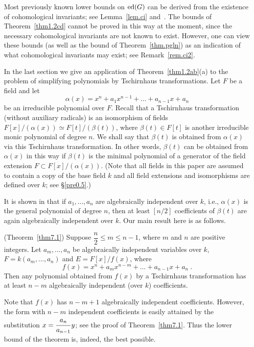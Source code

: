 Most previously known lower bounds on $\operatorname{ed}(G)$ can be derived from
the existence of cohomological invariants; see Lemma~\ref{lem.ci}
and~\cite[Section 12]{r2}.  The bounds of Theorem~\ref{thm1.2cd} cannot 
be proved in this way at the moment, since the necessary cohomological 
invariants are not known to exist. However, one can view these bounds
(as well as the bound of Theorem~\ref{thm.pgln}) as an indication of 
what cohomological invariants may exist; see Remark~\ref{rem.ci2}. 

\smallskip
In the last section we give an application of Theorem~\ref{thm1.2ab}(a)
to the problem of simplifying polynomials by Tschirnhaus transformations.
Let $F$ be a field and let \[ \alpha(x) =
x^n + a_1 x^{n-1} + \ldots + a_{n-1} x + a_n \] be an
irreducible polynomial over $F$. Recall that a Tschirnhaus transformation
(without auxiliary radicals) is an isomorphism of fields $F[x]/(\alpha(x)) 
\simeq F[t]/(\beta(t))$, where $\beta(t) \in F[t]$ is another 
irreducible monic polynomial of degree $n$. We shall say 
that $\beta(t)$ is obtained from $\alpha(x)$ via this Tschirnhaus 
transformation. In other words, $\beta(t)$ can be obtained
from $\alpha(x)$ in this way if $\beta(t)$ is the minimal polynomial
of a generator of the field extension $F \subset F[x]/(\alpha(x))$. (Note
that all fields in this paper are assumed to contain a copy of the base field
$k$ and all field extensions and isomorphisms are defined over $k$; see
\S\ref{pre0.5}.)

It is shown in 
\cite{br1} that if $a_1, \ldots, a_n$ are algebraically independent over 
$k$, i.e., $\alpha(x)$ is the general polynomial of degree $n$, then
at least $[n/2]$ coefficients of $\beta(t)$ are again algebraically 
independent over $k$. Our main result here is as follows.

\begin{thm} \label{thm1.3} (Theorem~\ref{thm7.1})
Suppose $\dfrac{n}{2} \leq m \leq n-1$, where $m$ and $n$ are positive
integers. 
Let $a_m, \dots, a_n$ be algebraically independent variables over $k$,
$F = k(a_m, \ldots, a_n)$ and $E = F[x]/f(x)$, where 
$$f(x) = x^n + a_m x^{n-m} + \dots + a_{n-1} x + a_n \; . $$
Then any polynomial obtained from $f(x)$ by a Tschirnhaus 
transformation has at least $n-m$ algebraically independent (over $k$)
coefficients.
\end{thm}

Note that $f(x)$ has $n-m+1$ algebraically independent coefficients. However, 
the form with $n-m$ independent coefficients is easily attained by the
substitution $x = \dfrac{\strut a_n}{a_{n-1}}y$; see the proof of 
Theorem~\ref{thm7.1}.  Thus the lower bound of the theorem is, 
indeed, the best possible. 

